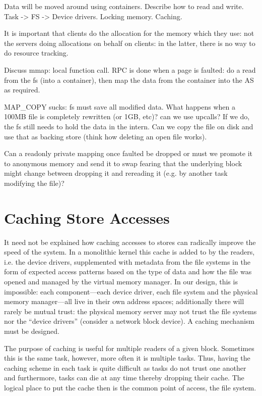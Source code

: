 Data will be moved around using containers.  Describe how to read and
write.  Task -> FS -> Device drivers.  Locking memory.  Caching.

It is important that clients do the allocation for the memory which
they use: not the servers doing allocations on behalf on clients: in
the latter, there is no way to do resource tracking.

Discuss mmap: local function call.  RPC is done when a page is
faulted: do a read from the fs (into a container), then map the data
from the container into the AS as required.

MAP_COPY sucks: fs must save all modified data.  What happens when a
100MB file is completely rewritten (or 1GB, etc)?  can we use upcalls?
If we do, the fs still needs to hold the data in the intern.  Can we
copy the file on disk and use that as backing store (think how
deleting an open file works).

Can a readonly private mapping once faulted be dropped or must we
promote it to anonymous memory and send it to swap fearing that the
underlying block might change between dropping it and rereading it
(e.g. by another task modifying the file)?

\section{Caching Store Accesses}

It need not be explained how caching accesses to stores can radically
improve the speed of the system.  In a monolithic kernel this cache is
added to by the readers, i.e. the device drivers, supplemented with
metadata from the file systems in the form of expected access patterns
based on the type of data and how the file was opened and managed by
the virtual memory manager.  In our design, this is impossible: each
component---each device driver, each file system and the physical
memory manager---all live in their own address spaces; additionally
there will rarely be mutual trust: the physical memory server may not
trust the file systems nor the ``device drivers'' (consider a network
block device).  A caching mechanism must be designed.

The purpose of caching is useful for multiple readers of a given
block.  Sometimes this is the same task, however, more often it is
multiple tasks.  Thus, having the caching scheme in each task is quite
difficult as tasks do not trust one another and furthermore, tasks can
die at any time thereby dropping their cache.  The logical place to
put the cache then is the common point of access, the file system.

